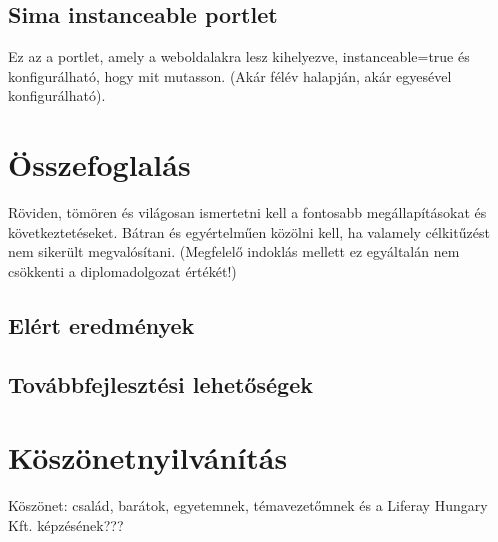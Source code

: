 \documentclass[hidelinks, 12pt, a4paper]{report}
\begin{document}
\section{Sima instanceable portlet}

Ez az a portlet, amely a weboldalakra lesz kihelyezve, instanceable=true és konfigurálható, hogy mit mutasson. (Akár félév halapján, akár egyesével konfigurálható).

\chapter{Összefoglalás}

Röviden, tömören és világosan ismertetni kell a fontosabb megállapításokat és következtetéseket. Bátran és egyértelműen közölni kell, ha valamely célkitűzést nem sikerült megvalósítani. (Megfelelő indoklás mellett ez egyáltalán nem csökkenti a diplomadolgozat értékét!)

\section{Elért eredmények}

\section{Továbbfejlesztési lehetőségek}

\clearpage
{}
\chapter*{Köszönetnyilvánítás}

Köszönet: család, barátok, egyetemnek, témavezetőmnek és a Liferay Hungary Kft. képzésének???

\end{document}
